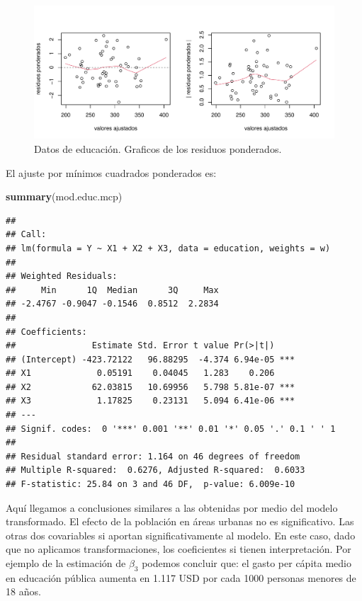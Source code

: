 \documentclass[
]{article}
\newenvironment{Shaded}{\begin{snugshade}}{\end{snugshade}}
\newcommand{\FunctionTok}[1]{\textcolor[rgb]{0.13,0.29,0.53}{\textbf{#1}}}
\newcommand{\NormalTok}[1]{#1}
\begin{document}
\begin{figure}

{\centering \includegraphics{MLG1_files/figure-latex/EducMCPFig-1} 

}

\caption{Datos de educación. Graficos de los residuos ponderados.}\label{fig:EducMCPFig}
\end{figure}

El ajuste por mínimos cuadrados ponderados es:

\begin{Shaded}
\begin{Highlighting}[]
\FunctionTok{summary}\NormalTok{(mod.educ.mcp)}
\end{Highlighting}
\end{Shaded}

\begin{verbatim}
## 
## Call:
## lm(formula = Y ~ X1 + X2 + X3, data = education, weights = w)
## 
## Weighted Residuals:
##     Min      1Q  Median      3Q     Max 
## -2.4767 -0.9047 -0.1546  0.8512  2.2834 
## 
## Coefficients:
##               Estimate Std. Error t value Pr(>|t|)    
## (Intercept) -423.72122   96.88295  -4.374 6.94e-05 ***
## X1             0.05191    0.04045   1.283    0.206    
## X2            62.03815   10.69956   5.798 5.81e-07 ***
## X3             1.17825    0.23131   5.094 6.41e-06 ***
## ---
## Signif. codes:  0 '***' 0.001 '**' 0.01 '*' 0.05 '.' 0.1 ' ' 1
## 
## Residual standard error: 1.164 on 46 degrees of freedom
## Multiple R-squared:  0.6276, Adjusted R-squared:  0.6033 
## F-statistic: 25.84 on 3 and 46 DF,  p-value: 6.009e-10
\end{verbatim}

Aquí llegamos a conclusiones similares a las obtenidas por medio del modelo transformado. El efecto de la población en áreas urbanas no es significativo. Las otras dos covariables si aportan significativamente al modelo. En este caso, dado que no aplicamos transformaciones, los coeficientes si tienen interpretación. Por ejemplo de la estimación de \(\beta_{3}\) podemos concluir que: el gasto per cápita medio en educación pública aumenta en 1.117 USD por cada 1000 personas menores de 18 años.
\end{document}
